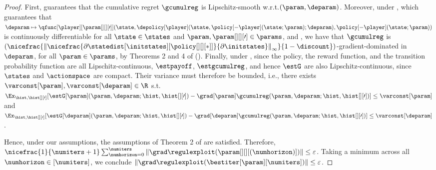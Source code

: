 \begin{proof}
First,  guarantees that the cumulative regret $\gcumulreg$ is Lipschitz-smooth w.r.t.\@ $(\param, \deparam)$.
    Moreover, under , which guarantees that $\deparam \mapsto \qfunc[\player][{\param[][][\prime]}] (\state, \depolicy[\player] (\state, \policy[-\player] (\state; \param); \deparam), 
    \policy[-\player] (\state; \param) 
    )$ is continuously differentiable for all $\state \in \states$ and $\param, \param[][][\prime] \in \params$, and , we have that $\gcumulreg$ is $\left(\nicefrac{\left\|\nicefrac{\partial\statedist[\initstates][{\policy[][][*]}]}{\partial \initstates} \right\|_\infty}{1-\discount} \right)$-gradient-dominated in $\deparam$, for all $\param \in \params$, by Theorems 2 and 4 of \citeauthor{bhandari2019global} (\citeyear{bhandari2019global}). 
    Finally, under , since the policy, the reward function, and the transition probability function are all Lipschitz-continuous, $\estpayoff$, $\estgcumulreg$, and hence $\estG$ are also Lipschitz-continuous, since $\states$ and $\actionspace$ are compact. 
    Their variance must therefore be bounded, i.e., there exists $\varconst[\param], \varconst[\deparam] \in \R$ s.t.\@ $\Ex_{\hist, \hist[][\prime]}[\estG[\param] (\param, \deparam; \hist, \hist[][\prime])- \grad[\param] \gcumulreg(\param, \deparam; \hist, \hist[][\prime])] \leq \varconst[\param]$ and $\Ex_{\hist, \hist[][\prime]}[\estG[\deparam] (\param, \deparam; \hist, \hist[][\prime])- \grad[\deparam] \gcumulreg(\param, \deparam; \hist, \hist[][\prime])] \leq \varconst[\deparam]$. 

    Hence, under our assumptions, the assumptions of Theorem 2 of \citeauthor{daskalakis2020independent} are satisfied.
    Therefore,
        $\nicefrac{1}{\numiters  + 1} \sum_{\numhorizon = 0}^\numiters \|\grad \regulexploit(\param[][][(\numhorizon)]) \|\leq \varepsilon$.
    Taking a minimum across all $\numhorizon \in [\numiters]$, 
    we conclude $\left\|\grad \regulexploit (\bestiter[{\param}][\numiters]) \right\| \leq \varepsilon$.
    

\end{proof}
